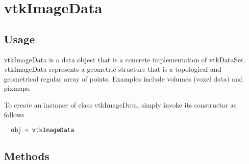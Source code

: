 \section{vtkImageData}

\subsection{Usage}

 vtkImageData is a data object that is a concrete implementation of
 vtkDataSet. vtkImageData represents a geometric structure that is
 a topological and geometrical regular array of points. Examples include
 volumes (voxel data) and pixmaps.

To create an instance of class vtkImageData, simply
invoke its constructor as follows
\begin{verbatim}
  obj = vtkImageData
\end{verbatim}
\subsection{Methods}

